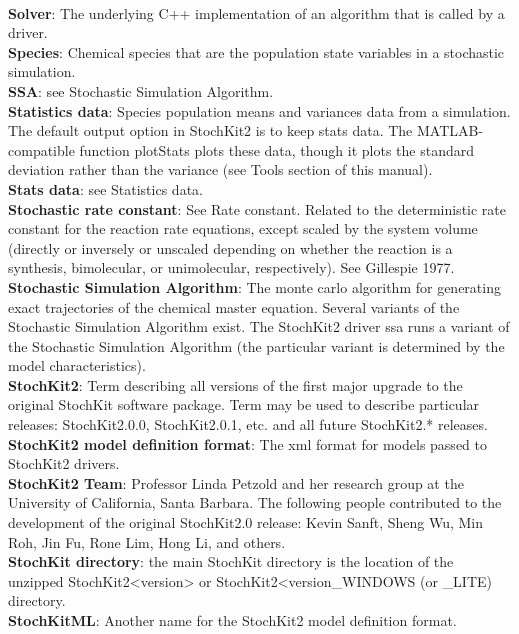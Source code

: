 \documentclass[11pt,letterpaper]{article}
\begin{document}
    \\\textbf{Solver}: The underlying C++ implementation of an algorithm that is called by a driver.
    \\\textbf{Species}: Chemical species that are the population state variables in a stochastic simulation.
    \\\textbf{SSA}: see Stochastic Simulation Algorithm.
    \\\textbf{Statistics data}: Species population means and variances data from a simulation.  The default output option in StochKit2 is to keep stats data.  The MATLAB-compatible function plotStats plots these data, though it plots the standard deviation rather than the variance (see Tools section of this manual).
    \\\textbf{Stats data}: see Statistics data.
    \\\textbf{Stochastic rate constant}: See Rate constant.  Related to the deterministic rate constant for the reaction rate equations, except scaled by the system volume (directly or inversely or unscaled depending on whether the reaction is a synthesis, bimolecular, or unimolecular, respectively).  See Gillespie 1977.
    \\\textbf{Stochastic Simulation Algorithm}: The monte carlo algorithm for generating exact trajectories of the chemical master equation.   Several variants of the Stochastic Simulation Algorithm exist.  The StochKit2 driver ssa runs a variant of the Stochastic Simulation Algorithm (the particular variant is determined by the model characteristics).
    \\\textbf{StochKit2}: Term describing all versions of the first major upgrade to the original StochKit software package.  Term may be used to describe particular releases: StochKit2.0.0, StochKit2.0.1, etc. and all future StochKit2.* releases.
    \\\textbf{StochKit2 model definition format}: The xml format for models passed to StochKit2 drivers.
    \\\textbf{StochKit2 Team}: Professor Linda Petzold and her research group at the University of California, Santa Barbara.  The following people contributed to the development of the original StochKit2.0 release: Kevin Sanft, Sheng Wu, Min Roh, Jin Fu, Rone Lim, Hong Li, and others.
    \\\textbf{StochKit directory}: the main StochKit directory is the location of the unzipped StochKit2<version> or StochKit2<version\_WINDOWS (or \_LITE) directory.
    \\\textbf{StochKitML}: Another name for the StochKit2 model definition format.
\end{document}
